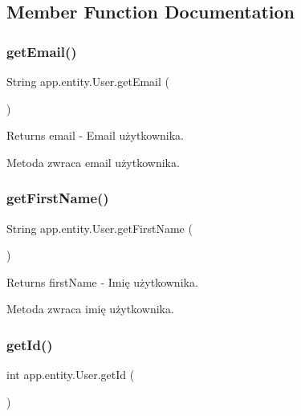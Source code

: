 \subsection{Member Function Documentation}
\mbox{\label{classapp_1_1entity_1_1_user_a1d8c16733a9d55b08708ba027b011c97}} 
\subsubsection{\texorpdfstring{getEmail()}{getEmail()}}
{\footnotesize\ttfamily String app.\+entity.\+User.\+get\+Email (\begin{DoxyParamCaption}{ }\end{DoxyParamCaption})}

\begin{DoxyReturn}{Returns}
email -\/ Email użytkownika.
\end{DoxyReturn}
Metoda zwraca email użytkownika. \mbox{\label{classapp_1_1entity_1_1_user_abcc62bde9e1bae566914365ca2eb1e5d}} 
\subsubsection{\texorpdfstring{getFirstName()}{getFirstName()}}
{\footnotesize\ttfamily String app.\+entity.\+User.\+get\+First\+Name (\begin{DoxyParamCaption}{ }\end{DoxyParamCaption})}

\begin{DoxyReturn}{Returns}
first\+Name -\/ Imię użytkownika.
\end{DoxyReturn}
Metoda zwraca imię użytkownika. \mbox{\label{classapp_1_1entity_1_1_user_a8a90b4368d45d1e983b103798f309ced}} 
\subsubsection{\texorpdfstring{getId()}{getId()}}
{\footnotesize\ttfamily int app.\+entity.\+User.\+get\+Id (\begin{DoxyParamCaption}{ }\end{DoxyParamCaption})}

